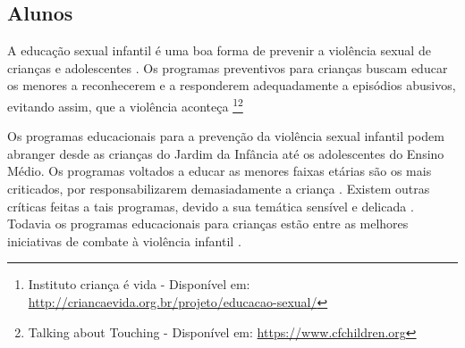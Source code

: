 \vspace{-0.2cm}


\subsection{Alunos}\label{ssec:alunos}\vspace{-0.15cm}

A educação sexual infantil é uma boa forma de prevenir a violência sexual de crianças e adolescentes \cite{finkelhor2009prevention}. Os programas preventivos para crianças buscam educar os menores a reconhecerem e a responderem adequadamente a episódios abusivos, evitando assim, que a violência aconteça \footnote{Instituto criança é vida - Disponível em: \url{http://criancaevida.org.br/projeto/educacao-sexual/}}\footnote{Talking about Touching - Disponível em: \url{https://www.cfchildren.org}}%

\vspace{-0.15cm}



Os programas educacionais para a prevenção da violência sexual infantil podem abranger desde as crianças do Jardim da Infância até os adolescentes do Ensino Médio. Os programas voltados a educar as menores faixas etárias são os mais criticados, por responsabilizarem demasiadamente a criança \cite{dip2016advancing}. %
Existem outras críticas feitas a tais programas, devido a sua temática sensível e delicada \cite{scholes2014serious}. Todavia os programas educacionais para crianças estão entre as melhores iniciativas de combate à violência infantil \cite{barron2008school}.%
\vspace{-0.15cm}


